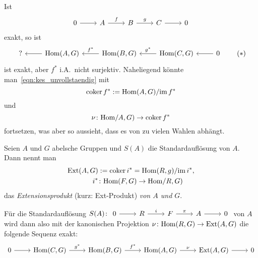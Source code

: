 Ist
\begin{equation*}
  \begin{tikzcd}
    0 \arrow{r}{}
      & A \arrow{r}{f}
      & B \arrow{r}{g}
      & C \arrow{r}{}
      & 0
  \end{tikzcd}
\end{equation*}
exakt, so ist
\begin{equation*}
  \begin{tikzcd}[arrows=leftarrow]
    ? \arrow{r}{}
      & \Hom(A,G) \arrow{r}{f^*}
      & \Hom(B,G) \arrow{r}{g^*}
      & \Hom(C,G) \arrow{r}{}
      & 0
  \end{tikzcd}
  \tag{$*$}\label{eqn:kes_unvollstaendig}
\end{equation*}
ist exakt, aber $f^*$ i.A.\ nicht surjektiv.
Naheliegend könnte man~\eqref{eqn:kes_unvollstaendig} mit
\begin{equation*}
  \operatorname{coker} f^* := \mathrm{Hom}(A,G) / {\operatorname{im} f^*}
\end{equation*}
und
\begin{equation*}
  \nu\colon \mathrm{Hom}/A,G) \to \operatorname{coker} f^*
\end{equation*}
fortsetzen, was aber so aussieht, dass es von zu vielen Wahlen abhängt.
\begin{defn}
  Seien $A$ und $G$ abelsche Gruppen und $S(A)$ die Standardauflösung von $A$.
  Dann nennt man
  \begin{align*}
    \mathrm{Ext}(A,G) &:= \operatorname{coker} i^* = \mathrm{Hom}(R,g) / {\operatorname{im} i^*}, \\
    i^* & \colon \mathrm{Hom}(F,G) \to \mathrm{Hom}/R,G)
  \end{align*}
  das \emph{Extensionsprodukt} (kurz: Ext-Produkt) \emph{von $A$ und $G$}.
\end{defn}
\begin{kommentar}
  Für die Standardauflösung $S(A)\colon \begin{tikzcd} 0 \arrow{r}{} &R\arrow{r}{i} &F\arrow{r}{\pi} &A\arrow{r}{}&0\end{tikzcd}$ von $A$ wird dann also mit der kanonischen Projektion $\nu\colon \mathrm{Hom}(R,G) \to \mathrm{Ext}(A,G)$ die folgende Sequenz exakt:
  \begin{equation*}
    \begin{tikzcd}
      0 \arrow{r}{}
        & \Hom(C,G) \arrow{r}{g^*}
        & \Hom(B,G) \arrow{r}{f^*}
        & \Hom(A,G) \arrow{r}{\nu}
        & \Ext(A,G) \arrow{r}{}
        & 0
    \end{tikzcd}
  \end{equation*}
\end{kommentar}
